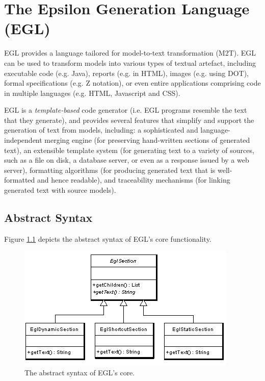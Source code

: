 
\chapter{The Epsilon Generation Language (EGL)}
\label{sec:EGL}
EGL provides a language tailored for model-to-text transformation (M2T). EGL can be used to transform models into various types of textual artefact, including executable code (e.g. Java), reports (e.g. in HTML), images (e.g. using DOT), formal specifications (e.g. Z notation), or even entire applications comprising code in multiple languages (e.g. HTML, Javascript and CSS).

EGL is a \emph{template-based} code generator (i.e. EGL programs resemble the text that they generate), and provides several features that simplify and support the generation of text from models, including: a sophisticated and language-independent merging engine (for preserving hand-written sections of generated text), an extensible template system (for generating text to a variety of sources, such as a file on disk, a database server, or even as a response issued by a web server), formatting algorithms (for producing generated text that is well-formatted and hence readable), and traceability mechanisms (for linking generated text with source models). 



\section{Abstract Syntax}
Figure \ref{fig:abstractsyntax} depicts the abstract syntax of EGL's core functionality.

\begin{figure}[htbp]
  \begin{center}
    \leavevmode
    \includegraphics[scale=0.80]{images/EglAbstractSyntax.png}
  \end{center}
  \caption{The abstract syntax of EGL's core.}
  \label{fig:abstractsyntax}
\end{figure}

